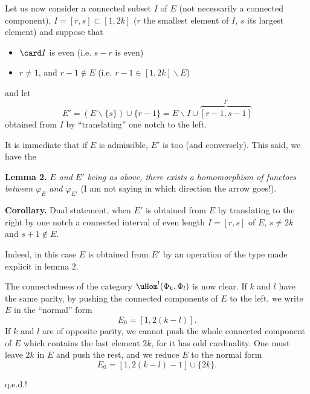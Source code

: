 Let us now consider a connected subset $I$ of $E$ (not necessarily a connected component), $I=[r,s]\subset[1,2k]$ ($r$ the smallest element of $I$, $s$ its largest element) and suppose that

\begin{itemize}
\item[a)] $\card I$ is even (i.e. $s-r$ is even) 
\item[b)] $r\neq1$, and $r-1\notin E$ (i.e. $r-1\in[1,2k]\backslash E$)
\end{itemize}

and let
\[
E'=(E\backslash\{s\})\cup\{r-1\}=E\backslash I\cup\overbrace{[r-1,s-1]}^{I'}
\]
obtained from $I$ by ``translating'' one notch to the left.

It is immediate that if $E$ is admissible, $E'$ is too (and conversely). This said, we have the

\textbf{Lemma 2.} \textit{$E$ and $E'$ being as above, there exists a homomorphism of functors between $\varphi_E$ and $\varphi_{E'}$} (I am not saying in which direction the arrow goes!). %

\textbf{Corollary.} Dual statement, when $E'$ is obtained from $E$ by translating to the right by one notch a connected interval of even length $I=[r,s]$ of $E$, $s\neq2k$ and $s+1\notin E$.

Indeed, in this case $E$ is obtained from $E'$ by an operation of the type made explicit in lemma 2.

The connectedness of the category $\uHom^{!}(\Phi_k,\Phi_l)$ is now clear. If $k$ and $l$ have the same parity, by pushing the connected components of $E$ to the left, we write $E$ in the ``normal'' form
\[
E_0=[1,2(k-l)].
\]
If $k$ and $l$ are of opposite parity, we cannot push the whole connected component of $E$ which contains the last element $2k$, for it has odd cardinality. One must leave $2k$ in $E$ and push the rest, and we reduce $E$ to the normal form
\[
E_0=[1,2(k-l)-1]\cup\{2k\}.
\]

\hfill q.e.d.!

